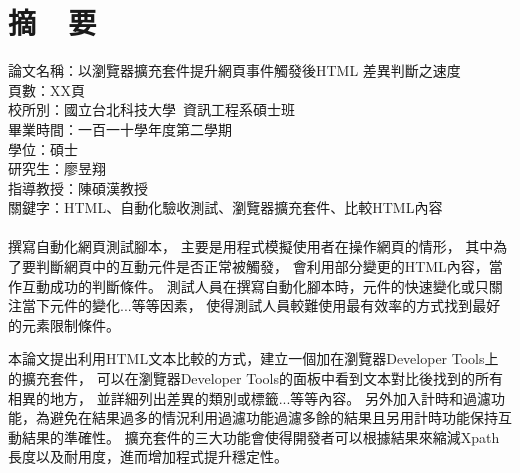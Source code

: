 \chapter*{摘~~要}


\noindent
論文名稱：以瀏覽器擴充套件提升網頁事件觸發後HTML 差異判斷之速度\\
頁數：XX頁\\
校所別：國立台北科技大學~資訊工程系碩士班\\
畢業時間：一百一十學年度第二學期\\
學位：碩士\\
研究生：廖昱翔\\
指導教授：陳碩漢教授\\
\noindent
關鍵字：HTML、自動化驗收測試、瀏覽器擴充套件、比較HTML內容\\
\hspace*{\fill}\\
%
\indent
撰寫自動化網頁測試腳本，
主要是用程式模擬使用者在操作網頁的情形，
其中為了要判斷網頁中的互動元件是否正常被觸發，
會利用部分變更的HTML內容，當作互動成功的判斷條件。
測試人員在撰寫自動化腳本時，元件的快速變化或只關注當下元件的變化...等等因素，
使得測試人員較難使用最有效率的方式找到最好的元素限制條件。

本論文提出利用HTML文本比較的方式，建立一個加在瀏覽器Developer Tools上的擴充套件，
可以在瀏覽器Developer Tools的面板中看到文本對比後找到的所有相異的地方，
並詳細列出差異的類別或標籤...等等內容。
另外加入計時和過濾功能，為避免在結果過多的情況利用過濾功能過濾多餘的結果且另用計時功能保持互動結果的準確性。
擴充套件的三大功能會使得開發者可以根據結果來縮減Xpath長度以及耐用度，進而增加程式提升穩定性。